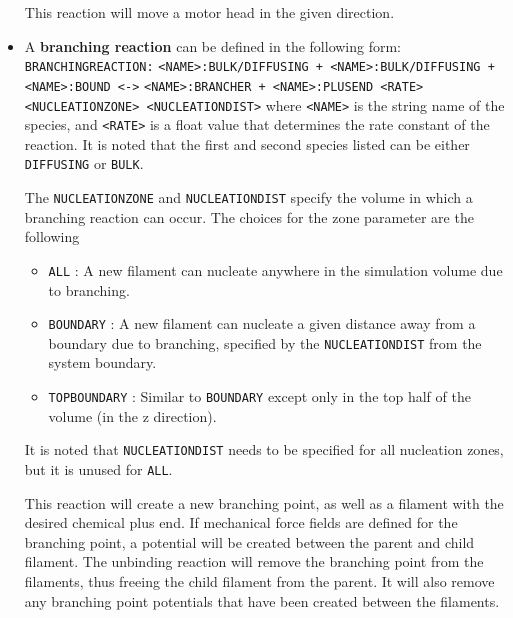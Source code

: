 \documentclass[11pt, oneside]{article}   	%
\begin{document}
\begin{itemize}
This reaction will move a motor head in the given direction.
 
\item A \textbf{branching reaction} can be defined in the following form:\newline\newline
\texttt{BRANCHINGREACTION:}\newline
\texttt{<NAME>:BULK/DIFFUSING + <NAME>:BULK/DIFFUSING +  <NAME>:BOUND <->}\newline
\texttt{<NAME>:BRANCHER + <NAME>:PLUSEND <RATE> <NUCLEATIONZONE> <NUCLEATIONDIST>}\newline\newline
where \texttt{<NAME>} is the string name of the species, and \texttt{<RATE>} is a float value that determines the rate constant of the reaction.  It is noted that the first and second species listed can be either \texttt{DIFFUSING} or \texttt{BULK}.

The \texttt{NUCLEATIONZONE} and \texttt{NUCLEATIONDIST} specify the volume in which a branching reaction can occur. The choices for the zone parameter are the following

\begin{itemize}
\item \texttt{ALL} : A new filament can nucleate anywhere in the simulation volume due to branching.
\item \texttt{BOUNDARY} : A new filament can nucleate a given distance away from a boundary due to branching, specified by the \texttt{NUCLEATIONDIST} from the system boundary.

\item \texttt{TOPBOUNDARY} : Similar to \texttt{BOUNDARY} except only in the top half of the volume (in the z direction).

\end{itemize}

It is noted that \texttt{NUCLEATIONDIST} needs to be specified for all nucleation zones, but it is unused for \texttt{ALL}.

This reaction will create a new branching point, as well as a filament with the desired chemical plus end. If mechanical force fields are defined for the branching point, a potential will be created between the parent and child filament. The unbinding reaction will remove the branching point from the filaments, thus freeing the child filament from the parent. It will also remove any branching point potentials that have been created between the filaments.
 

\end{itemize}
\end{document}
